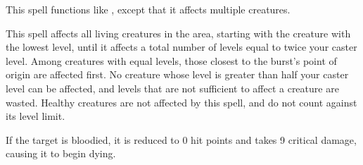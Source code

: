 \begin{spellsuccess}
  This spell functions like , except that it affects multiple creatures.
\end{spellsuccess}

\spellrng{\rngmed}
\begin{spelleffect}
    This spell affects all \bloodied living creatures in the area, starting with the creature with the lowest level, until it affects a total number of levels equal to twice your caster level. Among creatures with equal levels, those closest to the burst's point of origin are affected first. No creature whose level is greater than half your caster level can be affected, and levels that are not sufficient to affect a creature are wasted. Healthy creatures are not affected by this spell, and do not count against its level limit.
\end{spelleffect}
\begin{spellsuccess}
    If the target is bloodied, it is reduced to 0 hit points and takes 9 critical damage, causing it to begin dying.
\end{spellsuccess}


